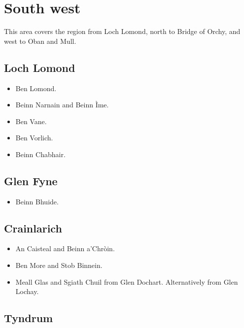 \section{South west}

This area covers the region from Loch Lomond, north to Bridge of Orchy, and
west to Oban and Mull.  

\subsection{Loch Lomond}

\begin{itemize}
\item Ben Lomond.

\item Beinn Narnain and Beinn Ìme.

\item Ben Vane.

\item Ben Vorlich.

\item Beinn Chabhair.
\end{itemize}


\subsection{Glen Fyne}

\begin{itemize}
\item Beinn Bhuide.
\end{itemize}


\subsection{Crainlarich}

\begin{itemize}
\item An Caisteal and Beinn a'Chròin.

\item Ben More and Stob Binnein.

\item Meall Glas and Sgiath Chuil from Glen Dochart.  Alternatively from Glen
  Lochay. 
\end{itemize}


\subsection{Tyndrum}


